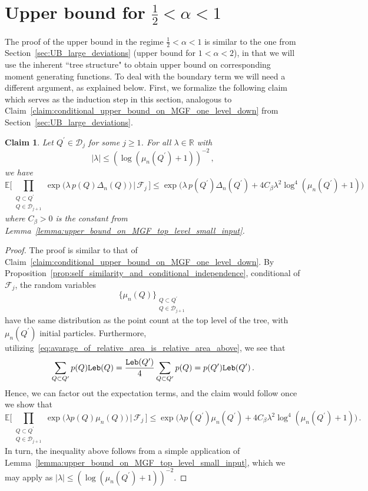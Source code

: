 \documentclass[11pt]{amsart}
\newtheorem{claim}[theorem]{Claim}
\theoremstyle{definition}
\theoremstyle{remark}
\numberwithin{equation}{section}
\def\la{{\lambda}}
\newcommand{\bR}{\mathbb R}
\newcommand{\bE}{\mathbb E}
\begin{document}
	\section{Upper bound for \texorpdfstring{$\frac{1}{2} < \alpha < 1$}{1/2 < alpha < 1}}
	\label{sec:UB_moderate_deviations}
	The proof of the upper bound in the regime $\frac{1}{2}<\alpha<1$ is similar to the one from Section~\ref{sec:UB_large_deviations} (upper bound for $1<\alpha<2$), in that we will use the inherent ``tree structure" to obtain upper bound on corresponding moment generating functions. To deal with the boundary term we will need a different argument, as explained below. First, we formalize the following claim which serves as the induction step in this section, analogous to Claim~\ref{claim:conditional_upper_bound_on_MGF_one_level_down} from Section~\ref{sec:UB_large_deviations}.
	\begin{claim}
		\label{claim:conditional_upper_bound_MGF_one_level_small_input}
		Let $Q^\prime\in \mathcal{D}_j$ for some $j\ge 1$. For all $\la\in \bR$ with $$|\la|\le (\log (\mu_n(Q^\prime)+1))^{-2}\, ,$$ we have
		\begin{equation*}
			\bE\Bigg[\prod_{\substack{Q\subset Q^\prime \\ Q\in \mathcal{D}_{j+1}}} \exp\Big(\la \, p(Q)  \Delta_n(Q)\Big)  \, \Big| \, \mathcal{F}_j \, \Bigg] \le \exp\bigg(\la \, p(Q^\prime) \Delta_n(Q^\prime) + 4C_\beta \la^2\log^4(\mu_n(Q^\prime)+1)\bigg)
		\end{equation*}
		where $C_\beta>0$ is the constant from Lemma~\ref{lemma:upper_bound_on_MGF_top_level_small_input}.
	\end{claim}
	\begin{proof}
		The proof is similar to that of Claim~\ref{claim:conditional_upper_bound_on_MGF_one_level_down}. By Proposition~\ref{prop:self_similarity_and_conditional_independence}, conditional of $\mathcal{F}_j$, the random variables
		\[
		\Big\{ \mu_n(Q) \Big\}_{\substack{Q\subset Q^\prime \\ Q\in \mathcal{D}_{j+1}}}
		\]
		have the same distribution as the point count at the top level of the tree, with $\mu_n(Q^\prime)$ initial particles. Furthermore, utilizing~\eqref{eq:avarage_of_relative_area_is_relative_area_above}, we see that
		\[
		\sum_{Q\subset Q^{\prime}} p(Q) {\tt Leb}(Q) = \frac{{\tt Leb}(Q^\prime)}{4}\sum_{Q\subset Q^{\prime}} p(Q) =  p(Q^\prime) {\tt Leb}(Q^\prime)\, .
		\]
		Hence, we can factor out the expectation terms, and the claim would follow once we show that
		\begin{equation*}
			\bE\Bigg[\prod_{\substack{Q\subset Q^\prime \\ Q\in \mathcal{D}_{j+1}}} \exp\Big(\la  p(Q)  \mu_n(Q)\Big)  \, \Big| \, \mathcal{F}_j \, \Bigg]  \le \exp\bigg(\la p(Q^\prime) \mu_n(Q^\prime) + 4C_\beta \la^2\log^4(\mu_n(Q^\prime)+1)\bigg) \, .
		\end{equation*}
		In turn, the inequality above follows from a simple application of Lemma~\ref{lemma:upper_bound_on_MGF_top_level_small_input}, which we may apply as $|\la| \le (\log (\mu_n(Q^\prime)+1))^{-2}$. 	
	\end{proof}
\end{document}
